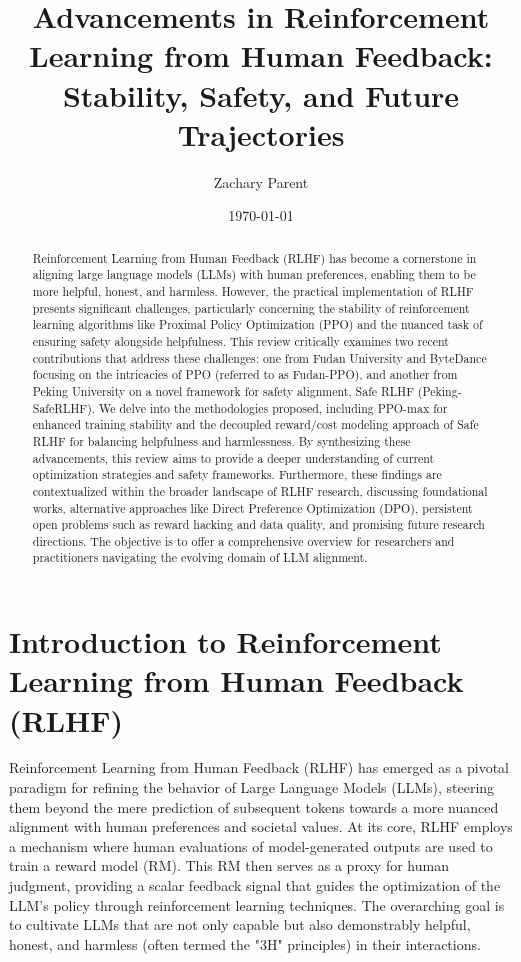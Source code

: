 \documentclass{article} %
\title{Advancements in Reinforcement Learning from Human Feedback: Stability, Safety, and Future Trajectories}
\author{Zachary Parent}
\date{\today}
\begin{document}
\maketitle

\begin{abstract}
Reinforcement Learning from Human Feedback (RLHF) has become a cornerstone in aligning large language models (LLMs) with human preferences, enabling them to be more helpful, honest, and harmless. However, the practical implementation of RLHF presents significant challenges, particularly concerning the stability of reinforcement learning algorithms like Proximal Policy Optimization (PPO) and the nuanced task of ensuring safety alongside helpfulness. This review critically examines two recent contributions that address these challenges: one from Fudan University and ByteDance focusing on the intricacies of PPO (referred to as Fudan-PPO), and another from Peking University on a novel framework for safety alignment, Safe RLHF (Peking-SafeRLHF). We delve into the methodologies proposed, including PPO-max for enhanced training stability and the decoupled reward/cost modeling approach of Safe RLHF for balancing helpfulness and harmlessness. By synthesizing these advancements, this review aims to provide a deeper understanding of current optimization strategies and safety frameworks. Furthermore, these findings are contextualized within the broader landscape of RLHF research, discussing foundational works, alternative approaches like Direct Preference Optimization (DPO), persistent open problems such as reward hacking and data quality, and promising future research directions. The objective is to offer a comprehensive overview for researchers and practitioners navigating the evolving domain of LLM alignment.
\end{abstract}

\section{Introduction to Reinforcement Learning from Human Feedback (RLHF)}
\label{sec:introduction}

Reinforcement Learning from Human Feedback (RLHF) has emerged as a pivotal paradigm for refining the behavior of Large Language Models (LLMs), steering them beyond the mere prediction of subsequent tokens towards a more nuanced alignment with human preferences and societal values. \cite{Ouyang2022InstructGPT, WikipediaRLHFPage} At its core, RLHF employs a mechanism where human evaluations of model-generated outputs are used to train a reward model (RM). This RM then serves as a proxy for human judgment, providing a scalar feedback signal that guides the optimization of the LLM's policy through reinforcement learning techniques. \cite{AWSRLHFExplainer} The overarching goal is to cultivate LLMs that are not only capable but also demonstrably helpful, honest, and harmless (often termed the "3H" principles) in their interactions. \cite{Ouyang2022InstructGPT}
\end{document}
